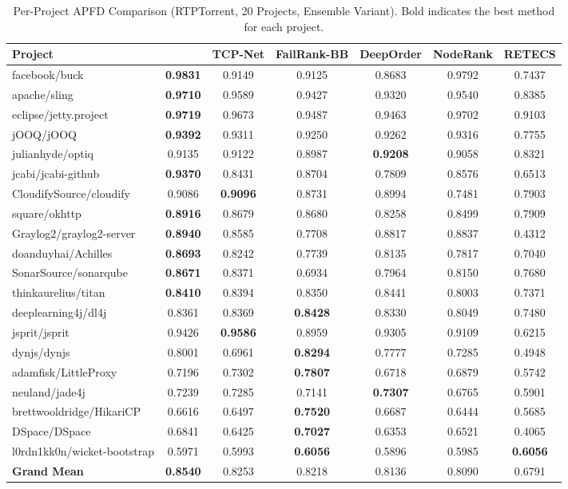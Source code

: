 \begin{table}[!t]
\centering
\caption{Per-Project APFD Comparison (RTPTorrent, 20 Projects, Ensemble Variant). Bold indicates the best method for each project.}
\label{tab:rtptorrent_perproject}
\footnotesize
\begin{tabular}{lcccccc}
\toprule
\textbf{Project} & \textbf{\filopriori{}} & \textbf{TCP-Net} & \textbf{FailRank-BB} & \textbf{DeepOrder} & \textbf{NodeRank} & \textbf{RETECS} \\
\midrule
facebook/buck & \textbf{0.9831} & 0.9149 & 0.9125 & 0.8683 & 0.9792 & 0.7437 \\
apache/sling & \textbf{0.9710} & 0.9589 & 0.9427 & 0.9320 & 0.9540 & 0.8385 \\
eclipse/jetty.project & \textbf{0.9719} & 0.9673 & 0.9487 & 0.9463 & 0.9702 & 0.9103 \\
jOOQ/jOOQ & \textbf{0.9392} & 0.9311 & 0.9250 & 0.9262 & 0.9316 & 0.7755 \\
julianhyde/optiq & 0.9135 & 0.9122 & 0.8987 & \textbf{0.9208} & 0.9058 & 0.8321 \\
jcabi/jcabi-github & \textbf{0.9370} & 0.8431 & 0.8704 & 0.7809 & 0.8576 & 0.6513 \\
CloudifySource/cloudify & 0.9086 & \textbf{0.9096} & 0.8731 & 0.8994 & 0.7481 & 0.7903 \\
square/okhttp & \textbf{0.8916} & 0.8679 & 0.8680 & 0.8258 & 0.8499 & 0.7909 \\
Graylog2/graylog2-server & \textbf{0.8940} & 0.8585 & 0.7708 & 0.8817 & 0.8837 & 0.4312 \\
doanduyhai/Achilles & \textbf{0.8693} & 0.8242 & 0.7739 & 0.8135 & 0.7817 & 0.7040 \\
SonarSource/sonarqube & \textbf{0.8671} & 0.8371 & 0.6934 & 0.7964 & 0.8150 & 0.7680 \\
thinkaurelius/titan & \textbf{0.8410} & 0.8394 & 0.8350 & 0.8441 & 0.8003 & 0.7371 \\
deeplearning4j/dl4j & 0.8361 & 0.8369 & \textbf{0.8428} & 0.8330 & 0.8049 & 0.7480 \\
jsprit/jsprit & 0.9426 & \textbf{0.9586} & 0.8959 & 0.9305 & 0.9109 & 0.6215 \\
dynjs/dynjs & 0.8001 & 0.6961 & \textbf{0.8294} & 0.7777 & 0.7285 & 0.4948 \\
adamfisk/LittleProxy & 0.7196 & 0.7302 & \textbf{0.7807} & 0.6718 & 0.6879 & 0.5742 \\
neuland/jade4j & 0.7239 & 0.7285 & 0.7141 & \textbf{0.7307} & 0.6765 & 0.5901 \\
brettwooldridge/HikariCP & 0.6616 & 0.6497 & \textbf{0.7520} & 0.6687 & 0.6444 & 0.5685 \\
DSpace/DSpace & 0.6841 & 0.6425 & \textbf{0.7027} & 0.6353 & 0.6521 & 0.4065 \\
l0rdn1kk0n/wicket-bootstrap & 0.5971 & 0.5993 & \textbf{0.6056} & 0.5896 & 0.5985 & \textbf{0.6056} \\
\midrule
\textbf{Grand Mean} & \textbf{0.8540} & 0.8253 & 0.8218 & 0.8136 & 0.8090 & 0.6791 \\
\bottomrule
\end{tabular}
\end{table}

